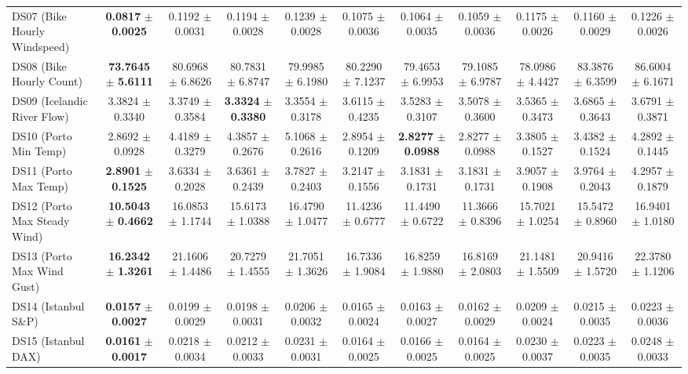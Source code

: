 \begin{table}[t]
{{\begin{tabular}{lcccccccccc}
DS07 (Bike Hourly Windspeed) & \textbf{0.0817} $\pm$ \textbf{0.0025} & 0.1192 $\pm$ 0.0031 & 0.1194 $\pm$ 0.0028 & 0.1239 $\pm$ 0.0028 & 0.1075 $\pm$ 0.0036 & 0.1064 $\pm$ 0.0035 & 0.1059 $\pm$ 0.0036 & 0.1175 $\pm$ 0.0026 & 0.1160 $\pm$ 0.0029 & 0.1226 $\pm$ 0.0026 \\
DS08 (Bike Hourly Count) & \textbf{73.7645} $\pm$ \textbf{5.6111} & 80.6968 $\pm$ 6.8626 & 80.7831 $\pm$ 6.8747 & 79.9985 $\pm$ 6.1980 & 80.2290 $\pm$ 7.1237 & 79.4653 $\pm$ 6.9953 & 79.1085 $\pm$ 6.9787 & 78.0986 $\pm$ 4.4427 & 83.3876 $\pm$ 6.3599 & 86.6004 $\pm$ 6.1671 \\
DS09 (Icelandic River Flow) & 3.3824 $\pm$ 0.3340 & 3.3749 $\pm$ 0.3584 & \textbf{3.3324} $\pm$ \textbf{0.3380} & 3.3554 $\pm$ 0.3178 & 3.6115 $\pm$ 0.4235 & 3.5283 $\pm$ 0.3107 & 3.5078 $\pm$ 0.3600 & 3.5365 $\pm$ 0.3473 & 3.6865 $\pm$ 0.3643 & 3.6791 $\pm$ 0.3871 \\
DS10 (Porto Min Temp) & 2.8692 $\pm$ 0.0928 & 4.4189 $\pm$ 0.3279 & 4.3857 $\pm$ 0.2676 & 5.1068 $\pm$ 0.2616 & 2.8954 $\pm$ 0.1209 & \textbf{2.8277} $\pm$ \textbf{0.0988} & 2.8277 $\pm$ 0.0988 & 3.3805 $\pm$ 0.1527 & 3.4382 $\pm$ 0.1524 & 4.2892 $\pm$ 0.1445 \\
DS11 (Porto Max Temp) & \textbf{2.8901} $\pm$ \textbf{0.1525} & 3.6334 $\pm$ 0.2028 & 3.6361 $\pm$ 0.2439 & 3.7827 $\pm$ 0.2403 & 3.2147 $\pm$ 0.1556 & 3.1831 $\pm$ 0.1731 & 3.1831 $\pm$ 0.1731 & 3.9057 $\pm$ 0.1908 & 3.9764 $\pm$ 0.2043 & 4.2957 $\pm$ 0.1879 \\
DS12 (Porto Max Steady Wind) & \textbf{10.5043} $\pm$ \textbf{0.4662} & 16.0853 $\pm$ 1.1744 & 15.6173 $\pm$ 1.0388 & 16.4790 $\pm$ 1.0477 & 11.4236 $\pm$ 0.6777 & 11.4490 $\pm$ 0.6722 & 11.3666 $\pm$ 0.8396 & 15.7021 $\pm$ 1.0254 & 15.5472 $\pm$ 0.8960 & 16.9401 $\pm$ 1.0180 \\
DS13 (Porto Max Wind Gust) & \textbf{16.2342} $\pm$ \textbf{1.3261} & 21.1606 $\pm$ 1.4486 & 20.7279 $\pm$ 1.4555 & 21.7051 $\pm$ 1.3626 & 16.7336 $\pm$ 1.9084 & 16.8259 $\pm$ 1.9880 & 16.8169 $\pm$ 2.0803 & 21.1481 $\pm$ 1.5509 & 20.9416 $\pm$ 1.5720 & 22.3780 $\pm$ 1.1206 \\
DS14 (Istanbul S\&P) & \textbf{0.0157} $\pm$ \textbf{0.0027} & 0.0199 $\pm$ 0.0029 & 0.0198 $\pm$ 0.0031 & 0.0206 $\pm$ 0.0032 & 0.0165 $\pm$ 0.0024 & 0.0163 $\pm$ 0.0027 & 0.0162 $\pm$ 0.0029 & 0.0209 $\pm$ 0.0024 & 0.0215 $\pm$ 0.0035 & 0.0223 $\pm$ 0.0036 \\
DS15 (Istanbul DAX) & \textbf{0.0161} $\pm$ \textbf{0.0017} & 0.0218 $\pm$ 0.0034 & 0.0212 $\pm$ 0.0033 & 0.0231 $\pm$ 0.0031 & 0.0164 $\pm$ 0.0025 & 0.0166 $\pm$ 0.0025 & 0.0164 $\pm$ 0.0025 & 0.0230 $\pm$ 0.0037 & 0.0223 $\pm$ 0.0035 & 0.0248 $\pm$ 0.0033 \\

\end{tabular}}}
\end{table}
